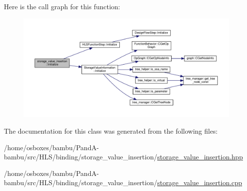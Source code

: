 Here is the call graph for this function\+:
\nopagebreak
\begin{figure}[H]
\begin{center}
\leavevmode
\includegraphics[width=350pt]{d3/d41/classstorage__value__insertion_a43f36ebf82f907a629125b1f0cc1b096_cgraph}
\end{center}
\end{figure}


The documentation for this class was generated from the following files\+:\begin{DoxyCompactItemize}
\item 
/home/osboxes/bambu/\+Pand\+A-\/bambu/src/\+H\+L\+S/binding/storage\+\_\+value\+\_\+insertion/\hyperlink{storage__value__insertion_8hpp}{storage\+\_\+value\+\_\+insertion.\+hpp}\item 
/home/osboxes/bambu/\+Pand\+A-\/bambu/src/\+H\+L\+S/binding/storage\+\_\+value\+\_\+insertion/\hyperlink{storage__value__insertion_8cpp}{storage\+\_\+value\+\_\+insertion.\+cpp}\end{DoxyCompactItemize}

